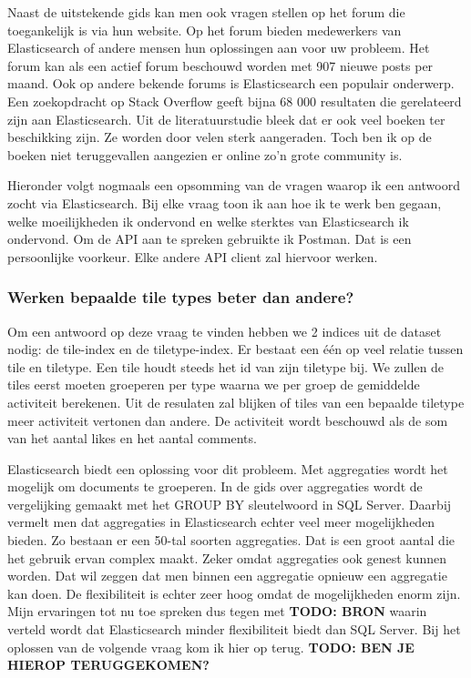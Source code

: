 Naast de uitstekende gids kan men ook vragen stellen op het forum die toegankelijk is via hun website. Op het forum bieden medewerkers van Elasticsearch of andere mensen hun oplossingen aan voor uw probleem. Het forum kan als een actief forum beschouwd worden met 907 nieuwe posts per maand. Ook op andere bekende forums is Elasticsearch een populair onderwerp. Een zoekopdracht op Stack Overflow geeft bijna 68 000 resultaten die gerelateerd zijn aan Elasticsearch. Uit de literatuurstudie bleek dat er ook veel boeken ter beschikking zijn. Ze worden door velen sterk aangeraden. Toch ben ik op de boeken niet teruggevallen aangezien er online zo'n grote community is. 

Hieronder volgt nogmaals een opsomming van de vragen waarop ik een antwoord zocht via Elasticsearch. Bij elke vraag toon ik aan hoe ik te werk ben gegaan, welke moeilijkheden ik ondervond en welke sterktes van Elasticsearch ik ondervond. Om de API aan te spreken gebruikte ik Postman. Dat is een persoonlijke voorkeur. Elke andere API client zal hiervoor werken.

\subsubsection{Werken bepaalde tile types beter dan andere?}
Om een antwoord op deze vraag te vinden hebben we 2 indices uit de dataset nodig: de tile-index en de tiletype-index. Er bestaat een één op veel relatie tussen tile en tiletype. Een tile houdt steeds het id van zijn tiletype bij. We zullen de tiles eerst moeten groeperen per type waarna we per groep de gemiddelde activiteit berekenen. Uit de resulaten zal blijken of tiles van een bepaalde tiletype meer activiteit vertonen dan andere. De activiteit wordt beschouwd als de som van het aantal likes en het aantal comments.

Elasticsearch biedt een oplossing voor dit probleem. Met aggregaties wordt het mogelijk om documents te groeperen. In de gids over aggregaties wordt de vergelijking gemaakt met het GROUP BY sleutelwoord in SQL Server. Daarbij vermelt men dat aggregaties in Elasticsearch echter veel meer mogelijkheden bieden. Zo bestaan er een 50-tal soorten aggregaties. Dat is een groot aantal die het gebruik ervan complex maakt. Zeker omdat aggregaties ook genest kunnen worden. Dat wil zeggen dat men binnen een aggregatie opnieuw een aggregatie kan doen. De flexibiliteit is echter zeer hoog omdat de mogelijkheden enorm zijn. Mijn ervaringen tot nu toe spreken dus tegen met \textbf{TODO: BRON} waarin verteld wordt dat Elasticsearch minder flexibiliteit biedt dan SQL Server. Bij het oplossen van de volgende vraag kom ik hier op terug. \textbf{TODO: BEN JE HIEROP TERUGGEKOMEN?}

